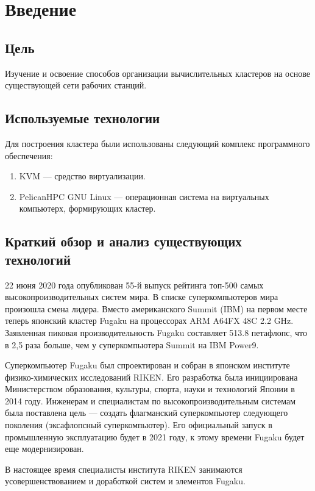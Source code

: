 \chapter{Введение}

\section{Цель}

Изучение и освоение способов организации вычислительных кластеров на основе существующей сети рабочих станций.

\section{Используемые технологии}
Для построения кластера были использованы следующий комплекс программного обеспечения:

\begin{enumerate}
  \item KVM --- средство виртуализации.
  \item PelicanHPC GNU Linux --- операционная система на виртуальных компьютерх, формирующих кластер.
\end{enumerate}

\section{Краткий обзор и анализ существующих технологий}

22 июня 2020 года опубликован 55-й выпуск рейтинга топ-500 самых высокопроизводительных систем мира. В списке суперкомпьютеров мира произошла смена лидера. Вместо американского Summit (IBM) на первом месте теперь японский кластер Fugaku на процессорах ARM A64FX 48C 2.2 GHz. Заявленная пиковая производительность Fugaku составляет 513.8 петафлопс, что в 2,5 раза больше, чем у суперкомпьютера Summit на IBM Power9.

Суперкомпьютер Fugaku был спроектирован и собран в японском институте физико-химических исследований RIKEN. Его разработка была инициирована Министерством образования, культуры, спорта, науки и технологий Японии в 2014 году. Инженерам и специалистам по высокопроизводительным системам была поставлена цель — создать флагманский суперкомпьютер следующего поколения (эксафлопсный суперкомпьютер). Его официальный запуск в промышленную эксплуатацию будет в 2021 году, к этому времени Fugaku будет еще модернизирован.

В настоящее время специалисты института RIKEN занимаются усовершенствованием и доработкой систем и элементов Fugaku.

